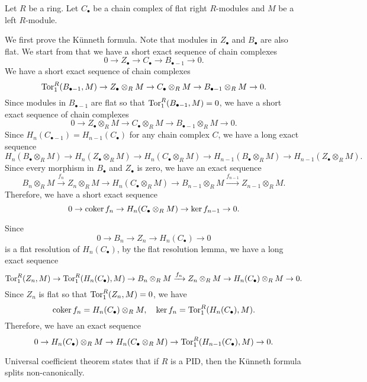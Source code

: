 \documentclass{../../large}
\begin{document}
\begin{prb}
Let $R$ be a ring.
Let $C_\bullet$ be a chain complex of flat right $R$-modules and $M$ be a left $R$-module.
\end{prb}
\begin{pf}
We first prove the K\"unneth formula.
Note that modules in $Z_\bullet$ and $B_\bullet$ are also flat.
We start from that we have a short exact sequence of chain complexes
\[0\to Z_\bullet\to C_\bullet\to B_{\bullet-1}\to0.\]
We have a short exact sequence of chain complexes
\[\operatorname{Tor}_1^R(B_{\bullet-1},M)\to Z_\bullet\otimes_RM\to C_\bullet\otimes_RM\to B_{\bullet-1}\otimes_RM\to0.\]
Since modules in $B_{\bullet-1}$ are flat so that $\operatorname{Tor}_1^R(B_{\bullet-1},M)=0$, we have a short exact sequence of chain complexes
\[0\to Z_\bullet\otimes_RM\to C_\bullet\otimes_RM\to B_{\bullet-1}\otimes_RM\to0.\]
Since $H_n(C_{\bullet-1})=H_{n-1}(C_\bullet)$ for any chain complex $C$, we have a long exact sequence
\[H_n(B_\bullet\otimes_RM)\to H_n(Z_\bullet\otimes_RM)\to H_n(C_\bullet\otimes_RM)\to H_{n-1}(B_\bullet\otimes_RM)\to H_{n-1}(Z_\bullet\otimes_RM).\]
Since every morphism in $B_\bullet$ and $Z_\bullet$ is zero, we have an exact sequence
\[B_n\otimes_RM\xrightarrow{f_n}Z_n\otimes_RM\to H_n(C_\bullet\otimes_RM)\to B_{n-1}\otimes_RM\xrightarrow{f_{n-1}}Z_{n-1}\otimes_RM.\]
Therefore, we have a short exact sequence
\[0\to\operatorname{coker} f_n\to H_n(C_\bullet\otimes_RM)\to\ker f_{n-1}\to0.\]

Since
\[0\to B_n\to Z_n\to H_n(C_\bullet)\to0\]
is a flat resolution of $H_n(C_\bullet)$, by the flat resolution lemma, we have a long exact sequence
\[\operatorname{Tor}_1^R(Z_n,M)\to\operatorname{Tor}_1^R(H_n(C_\bullet),M)\to B_n\otimes_RM\xrightarrow{f_n}Z_n\otimes_RM\to H_n(C_\bullet)\otimes_RM\to0.\]
Since $Z_n$ is flat so that $\operatorname{Tor}_1^R(Z_n,M)=0$, we have
\[\operatorname{coker} f_n=H_n(C_\bullet)\otimes_RM,\quad\ker f_n=\operatorname{Tor}_1^R(H_n(C_\bullet),M).\]
Therefore, we have an exact sequence
\[0\to H_n(C_\bullet)\otimes_RM\to H_n(C_\bullet\otimes_RM)\to\operatorname{Tor}_1^R(H_{n-1}(C_\bullet),M)\to0.\]

Universal coefficient theorem states that if $R$ is a PID, then the K\"unneth formula splits non-canonically.
\end{pf}
\end{document}
